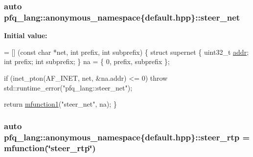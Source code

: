 \hypertarget{namespacepfq__lang_1_1anonymous__namespace_02default_8hpp_03_a2c53e95204f3841919f780940b607d68}{
\subsubsection[{steer\+\_\+net}]{\setlength{\rightskip}{0pt plus 5cm}auto pfq\+\_\+lang\+::anonymous\+\_\+namespace\{default.\+hpp\}\+::steer\+\_\+net}}\label{namespacepfq__lang_1_1anonymous__namespace_02default_8hpp_03_a2c53e95204f3841919f780940b607d68}
{\bfseries Initial value\+:}
\begin{DoxyCode}
= [] (\textcolor{keyword}{const} \textcolor{keywordtype}{char} *net, \textcolor{keywordtype}{int} prefix, \textcolor{keywordtype}{int} subprefix)
        \{
            \textcolor{keyword}{struct }supernet \{
                uint32\_t \hyperlink{namespacepfq__lang_1_1anonymous__namespace_02default_8hpp_03_aafce8334d1be83bff9a2115439c8c453}{addr};
                \textcolor{keywordtype}{int}      prefix;
                \textcolor{keywordtype}{int}      subprefix;
            \} na = \{ 0, prefix, subprefix \};

            \textcolor{keywordflow}{if} (inet\_pton(AF\_INET, net, &na.addr) <= 0)
                \textcolor{keywordflow}{throw} std::runtime\_error(\textcolor{stringliteral}{"pfq\_lang::steer\_net"});

            \textcolor{keywordflow}{return} \hyperlink{namespacepfq__lang_a3cc9d61411c0398bb46aa2b33a21f7ed}{mfunction1}(\textcolor{stringliteral}{"steer\_net"}, na);
        \}
\end{DoxyCode}
\hypertarget{namespacepfq__lang_1_1anonymous__namespace_02default_8hpp_03_a16b18fdc10f8dd8c0974d9f0d6c13af9}{
\subsubsection[{steer\+\_\+rtp}]{\setlength{\rightskip}{0pt plus 5cm}auto pfq\+\_\+lang\+::anonymous\+\_\+namespace\{default.\+hpp\}\+::steer\+\_\+rtp = {\bf mfunction}(\char`\"{}steer\+\_\+rtp\char`\"{})}}\label{namespacepfq__lang_1_1anonymous__namespace_02default_8hpp_03_a16b18fdc10f8dd8c0974d9f0d6c13af9}
